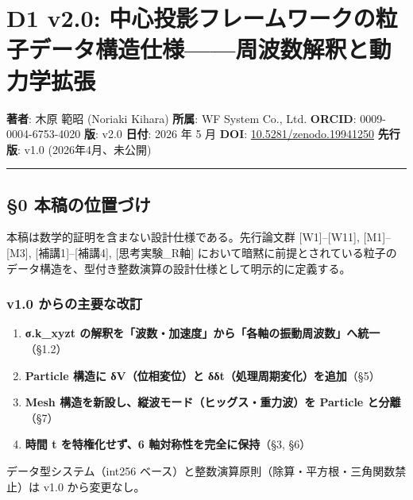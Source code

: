 \documentclass[a4paper,11pt]{ltjsarticle}
\providecommand{\tightlist}{\setlength{\itemsep}{0pt}\setlength{\parskip}{0pt}}
\begin{document}
\section{D1 v2.0:
中心投影フレームワークの粒子データ構造仕様------周波数解釈と動力学拡張}\label{d1-v2.0-ux4e2dux5fc3ux6295ux5f71ux30d5ux30ecux30fcux30e0ux30efux30fcux30afux306eux7c92ux5b50ux30c7ux30fcux30bfux69cbux9020ux4ed5ux69d8ux5468ux6ce2ux6570ux89e3ux91c8ux3068ux52d5ux529bux5b66ux62e1ux5f35}

\textbf{著者}: 木原 範昭 (Noriaki Kihara) \textbf{所属}: WF System Co.,
Ltd. \textbf{ORCID}: 0009-0004-6753-4020 \textbf{版}: v2.0
\textbf{日付}: 2026 年 5 月 \textbf{DOI}:
\href{https://doi.org/10.5281/zenodo.19941250}{10.5281/zenodo.19941250}
\textbf{先行版}: v1.0 (2026年4月、未公開)

\begin{center}\rule{0.5\linewidth}{0.5pt}\end{center}

\subsection{§0
本稿の位置づけ}\label{ux672cux7a3fux306eux4f4dux7f6eux3065ux3051}

本稿は数学的証明を含まない設計仕様である。先行論文群
{[}W1{]}--{[}W11{]}, {[}M1{]}--{[}M3{]}, {[}補講1{]}--{[}補講4{]},
{[}思考実験\_R軸{]}
において暗黙に前提とされている粒子のデータ構造を、型付き整数演算の設計仕様として明示的に定義する。

\subsubsection{v1.0
からの主要な改訂}\label{v1.0-ux304bux3089ux306eux4e3bux8981ux306aux6539ux8a02}

\begin{enumerate}
\def\labelenumi{\arabic{enumi}.}
\tightlist
\item
  \textbf{σ.k\_xyzt
  の解釈を「波数・加速度」から「各軸の振動周波数」へ統一}（§1.2）
\item
  \textbf{Particle 構造に δV（位相変位）と
  δδt（処理周期変化）を追加}（§5）
\item
  \textbf{Mesh 構造を新設し、縦波モード（ヒッグス・重力波）を Particle
  と分離}（§7）
\item
  \textbf{時間 t を特権化せず、6 軸対称性を完全に保持}（§3, §6）
\end{enumerate}

データ型システム（int256
ベース）と整数演算原則（除算・平方根・三角関数禁止）は v1.0
から変更なし。
\end{document}
